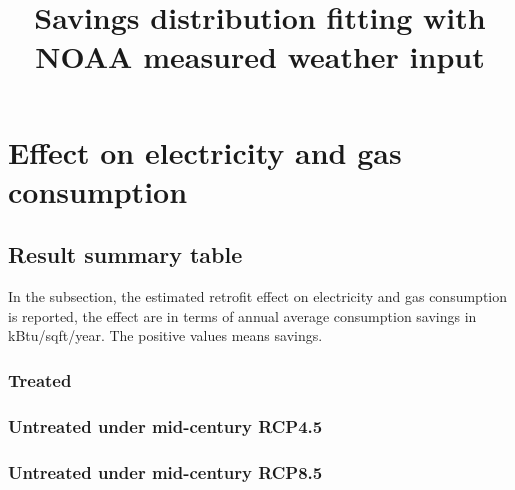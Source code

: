 \documentclass[12pt]{article}
\begin{document}
\title{Savings distribution fitting with NOAA measured weather input}
\maketitle
\tableofcontents
\newpage
\section{Effect on electricity and gas consumption}
\subsection{Result summary table}
In the subsection, the estimated retrofit effect on electricity and gas
consumption is reported, the effect are in terms of annual average consumption
savings in kBtu/sqft/year. The positive values means savings.
\subsubsection{Treated}








\subsubsection{Untreated under mid-century RCP4.5}








\subsubsection{Untreated under mid-century RCP8.5}








\end{document}
